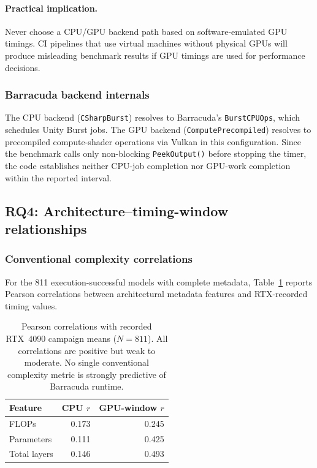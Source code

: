 \documentclass[10pt,twocolumn]{article}
\begin{document}
\paragraph{Practical implication.} Never choose a CPU/GPU backend path based on software-emulated GPU timings. CI pipelines that use virtual machines without physical GPUs will produce misleading benchmark results if GPU timings are used for performance decisions.

\subsubsection{Barracuda backend internals}

The CPU backend (\texttt{CSharpBurst}) resolves to Barracuda's \texttt{BurstCPUOps}, which schedules Unity Burst jobs. The GPU backend (\texttt{ComputePrecompiled}) resolves to precompiled compute-shader operations via Vulkan in this configuration. Since the benchmark calls only non-blocking \texttt{PeekOutput()} before stopping the timer, the code establishes neither CPU-job completion nor GPU-work completion within the reported interval.

\subsection{RQ4: Architecture--timing-window relationships}\label{sec:rq4}

\subsubsection{Conventional complexity correlations}

For the 811 execution-successful models with complete metadata, Table~\ref{tab:corr} reports Pearson correlations between architectural metadata features and RTX-recorded timing values.

\begin{table}[t]
\centering\small
\begin{tabular}{lrr}
\toprule
Feature & CPU $r$ & GPU-window $r$ \\
\midrule
FLOPs & 0.173 & 0.245 \\
Parameters & 0.111 & 0.425 \\
Total layers & 0.146 & 0.493 \\
\bottomrule
\end{tabular}
\caption{Pearson correlations with recorded RTX~4090 campaign means ($N = 811$). All correlations are positive but weak to moderate. No single conventional complexity metric is strongly predictive of Barracuda runtime.}
\label{tab:corr}
\end{table}
\end{document}
